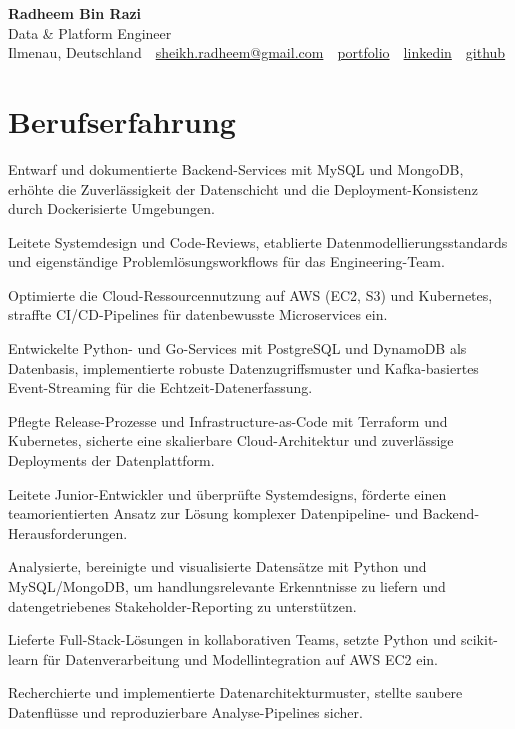 \documentclass[11pt,a4paper]{resume}
\makeatletter
\newcommand{\Portfolio}{https://radheem.github.io/my-cv}
\newcommand{\PortfolioText}{portfolio}
\newcommand{\GitHub}{https://github.com/radheem}
\newcommand{\LinkedIn}{https://www.linkedin.com/in/radheem-razi}
\newcommand{\Email}{sheikh.radheem@gmail.com}
\makeatother
\begin{document}
\clearpage
{}

\begin{center}
  {\huge\bfseries Radheem Bin Razi}\\[3pt]
  {\large Data \& Platform Engineer}\\[6pt]
  \small
  Ilmenau, Deutschland \,\textbar\,
  \href{mailto:\Email}{\Email} \,\textbar\,
  \href{\Portfolio}{\PortfolioText} \,\textbar\,
  \href{\LinkedIn}{linkedin} \,\textbar\,
  \href{\GitHub}{github}
\end{center}
\vspace{2pt}

\section{Berufserfahrung}

\bullets
  \item Entwarf und dokumentierte Backend-Services mit MySQL und MongoDB, erhöhte die Zuverlässigkeit der Datenschicht und die Deployment-Konsistenz durch Dockerisierte Umgebungen.
  \item Leitete Systemdesign und Code-Reviews, etablierte Datenmodellierungsstandards und eigenständige Problemlösungsworkflows für das Engineering-Team.
  \item Optimierte die Cloud-Ressourcennutzung auf AWS (EC2, S3) und Kubernetes, straffte CI/CD-Pipelines für datenbewusste Microservices ein.
\bulletsend
\vspace{3pt}
\bullets
  \item Entwickelte Python- und Go-Services mit PostgreSQL und DynamoDB als Datenbasis, implementierte robuste Datenzugriffsmuster und Kafka-basiertes Event-Streaming für die Echtzeit-Datenerfassung.
  \item Pflegte Release-Prozesse und Infrastructure-as-Code mit Terraform und Kubernetes, sicherte eine skalierbare Cloud-Architektur und zuverlässige Deployments der Datenplattform.
  \item Leitete Junior-Entwickler und überprüfte Systemdesigns, förderte einen teamorientierten Ansatz zur Lösung komplexer Datenpipeline- und Backend-Herausforderungen.
\bulletsend
\vspace{3pt}
\bullets
  \item Analysierte, bereinigte und visualisierte Datensätze mit Python und MySQL/MongoDB, um handlungsrelevante Erkenntnisse zu liefern und datengetriebenes Stakeholder-Reporting zu unterstützen.
  \item Lieferte Full-Stack-Lösungen in kollaborativen Teams, setzte Python und scikit-learn für Datenverarbeitung und Modellintegration auf AWS EC2 ein.
  \item Recherchierte und implementierte Datenarchitekturmuster, stellte saubere Datenflüsse und reproduzierbare Analyse-Pipelines sicher.
\bulletsend
\vspace{3pt}
\end{document}
